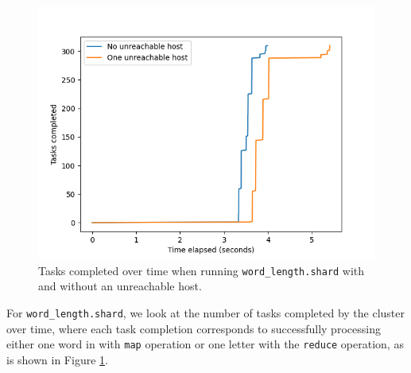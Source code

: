 \documentclass[oneside]{report}
\begin{document}
\begin{figure}[h]
  \begin{center}
    \includegraphics[scale=0.9]{img/experiments/e4_1620960581241.png}
    \caption{Tasks completed over time when running \texttt{word\_length.shard} with and without an unreachable host.}
    \label{fig:unreachable}
  \end{center}
\end{figure}

For \texttt{word\_length.shard}, we look at the number of tasks completed by the cluster over time, where each task completion corresponds to successfully processing either one word in with \texttt{map} operation or one letter with the \texttt{reduce} operation, as is shown in Figure \ref{fig:unreachable}.
\end{document}
